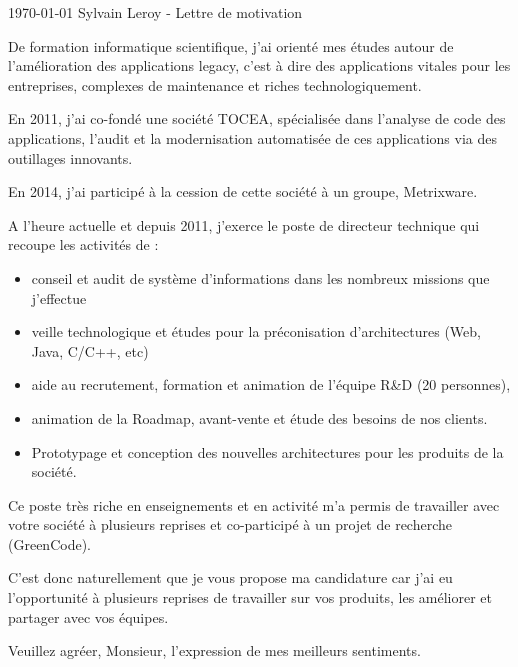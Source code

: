 \documentclass[11pt, a4paper]{awesome-cv}
\begin{document}
\makecvheader

\makecvfooter
  {\today}
  {Sylvain Leroy - Lettre de motivation}
  {}

\makelettertitle

\begin{cvletter}


De formation informatique scientifique, j'ai orienté mes études autour de l'amélioration des applications legacy, c'est à dire des applications vitales pour les entreprises, complexes de maintenance et riches technologiquement. 

En 2011, j'ai co-fondé une société TOCEA, spécialisée dans l'analyse de code des applications, l'audit et la modernisation automatisée de ces applications via des outillages innovants.

En 2014, j'ai participé à la cession de cette société à un groupe, Metrixware.

A l'heure actuelle et depuis 2011, j'exerce le poste de directeur technique qui recoupe les activités de :

\begin{itemize}
	\item conseil et audit de système d'informations dans les nombreux missions que j'effectue
	\item veille technologique et études pour la préconisation d'architectures (Web, Java, C/C++, etc)
	\item aide au recrutement, formation et animation de l'équipe R\&D (20 personnes),
	\item animation de la Roadmap, avant-vente et étude des besoins de nos clients.
	\item Prototypage et conception des nouvelles architectures pour les produits de la société.
\end{itemize}

Ce poste très riche en enseignements et en activité m'a permis de travailler avec votre société à plusieurs reprises et co-participé à un projet de recherche (GreenCode).

C'est donc naturellement que je vous propose ma candidature car j'ai eu l'opportunité à plusieurs reprises de travailler sur vos produits, les améliorer et partager avec vos équipes.


Veuillez agréer, Monsieur, l'expression de mes meilleurs sentiments.


\end{cvletter}


\makeletterclosing
\end{document}
